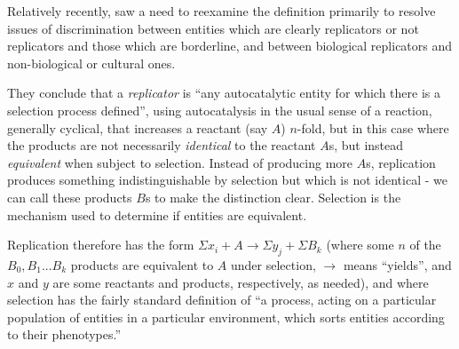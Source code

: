 %
%

Relatively recently, \textcite{Zachar2010} saw a need to reexamine the definition primarily to resolve issues of discrimination between entities which are clearly replicators or not replicators and those which are borderline, and between biological replicators and non-biological or cultural ones. 


They conclude that a \textit{replicator} is ``any autocatalytic entity for which there is a selection process defined'', using autocatalysis in the usual sense of a reaction, generally cyclical, that increases a reactant (say $A$) $n$-fold, but in this case where the products are not necessarily \textit{identical} to the reactant $A$s, but instead \textit{equivalent} when subject to selection. Instead of producing more $A$s, replication produces something indistinguishable by selection but which is not identical - we can call these products $B$s to make the distinction clear. Selection is the mechanism used to determine if entities are equivalent. 

Replication therefore has the form $\Sigma x_i + A\rightarrow \Sigma y_j + \Sigma B_k$ (where some $n$ of the ${B_0, B_1...B_k}$ products are equivalent to $A$ under selection, $\rightarrow$ means ``yields'', and $x$ and $y$ are some reactants and products, respectively, as needed), and where selection has the fairly standard definition of ``a process, acting on a particular population of entities in a particular environment, which sorts entities according to their phenotypes.'' \parencite[p.21]{Zachar2010} 

